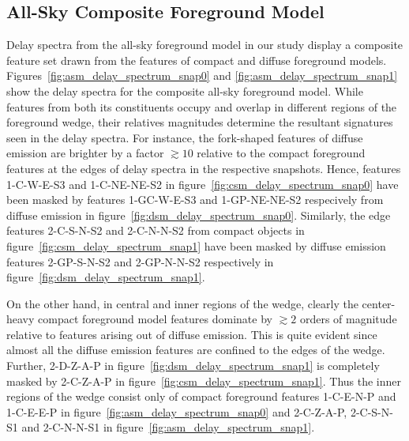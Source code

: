 \documentclass[preprint2,iop,numberedappendix]{emulateapj}
\begin{document}

\subsection{All-Sky Composite Foreground Model}\label{sec:composite}

Delay spectra from the all-sky foreground model in our study display a composite feature set drawn from the features of compact and diffuse foreground models. Figures~\ref{fig:asm_delay_spectrum_snap0} and \ref{fig:asm_delay_spectrum_snap1} show the delay spectra for the composite all-sky foreground model. While features from both its constituents occupy and overlap in different regions of the foreground wedge, their relatives magnitudes determine the resultant signatures seen in the delay spectra. For instance, the fork-shaped features of diffuse emission are brighter by a factor $\gtrsim 10$ relative to the compact foreground features at the edges of delay spectra in the respective snapshots. Hence, features 1-C-W-E-S3 and 1-C-NE-NE-S2 in figure~\ref{fig:csm_delay_spectrum_snap0} have been masked by features 1-GC-W-E-S3 and 1-GP-NE-NE-S2 respecively from diffuse emission in figure~\ref{fig:dsm_delay_spectrum_snap0}. Similarly, the edge features 2-C-S-N-S2 and 2-C-N-N-S2 from compact objects in figure~\ref{fig:csm_delay_spectrum_snap1} have been masked by diffuse emission features 2-GP-S-N-S2 and 2-GP-N-N-S2 respectively in figure~\ref{fig:dsm_delay_spectrum_snap1}.

On the other hand, in central and inner regions of the wedge, clearly the center-heavy compact foreground model features dominate by $\gtrsim 2$ orders of magnitude relative to features arising out of diffuse emission. This is quite evident since almost all the diffuse emission features are confined to the edges of the wedge. Further, 2-D-Z-A-P in figure~\ref{fig:dsm_delay_spectrum_snap1} is completely masked by 2-C-Z-A-P in figure~\ref{fig:csm_delay_spectrum_snap1}. Thus the inner regions of the wedge consist only of compact foreground features 1-C-E-N-P and 1-C-E-E-P in figure~\ref{fig:asm_delay_spectrum_snap0} and 2-C-Z-A-P, 2-C-S-N-S1 and 2-C-N-N-S1 in figure~\ref{fig:asm_delay_spectrum_snap1}.
\end{document}
